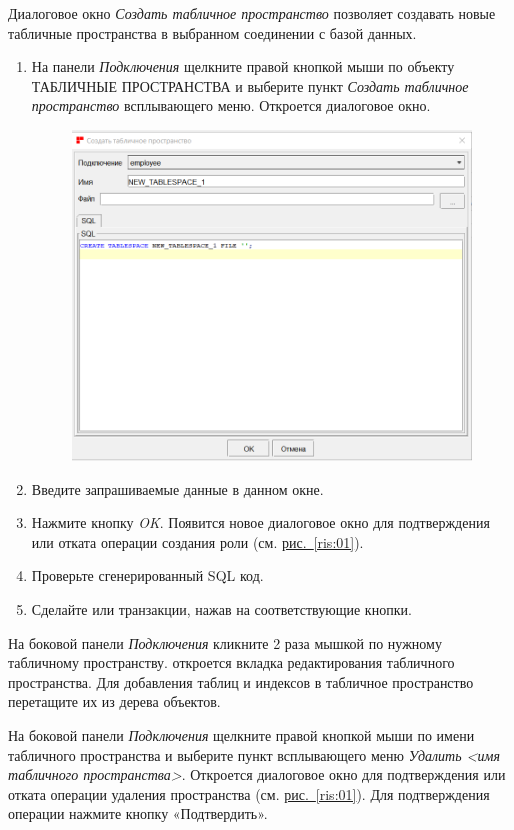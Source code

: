 

Диалоговое окно \textit{Создать табличное пространство} позволяет создавать новые табличные пространства в выбранном соединении с базой данных.

\begin{enumerate}[leftmargin=26pt]
	\item На панели \textit{Подключения} щелкните правой кнопкой мыши по объекту ТАБЛИЧНЫЕ ПРОСТРАНСТВА и выберите пункт \textit{Создать табличное пространство} всплывающего меню. Откроется диалоговое окно.
	\begin{figure}[H]
		\centering
		\includegraphics[width = 0.6\linewidth]{img/create_tablespace.png}
	\end{figure}
	\item Введите запрашиваемые данные в данном окне.
	\item Нажмите кнопку \textit{OK}. Появится новое диалоговое окно для подтверждения или отката операции создания роли (см. \hyperref[ris:01]{рис.~\ref{ris:01}}).
	\item Проверьте сгенерированный SQL код.
	\item Сделайте  или  транзакции, нажав на соответствующие кнопки.
\end{enumerate}

На боковой панели \textit{Подключения} кликните 2 раза мышкой по нужному табличному пространству. откроется вкладка редактирования табличного пространства. Для добавления таблиц и индексов в табличное пространство перетащите их из дерева объектов. 

На боковой панели \textit{Подключения} щелкните правой кнопкой мыши по имени табличного пространства и выберите пункт всплывающего меню \textit{Удалить <имя табличного пространства>}. Откроется  диалоговое окно для подтверждения или отката операции удаления пространства (см. \hyperref[ris:01]{рис.~\ref{ris:01}}). Для подтверждения операции нажмите кнопку «Подтвердить».

